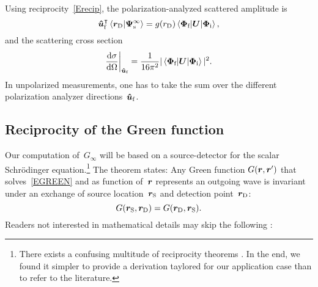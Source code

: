 Using reciprocity~\cref{Erecip},
the polarization-analyzed scattered amplitude is
\begin{equation}
  {\bm{\hat u}}_{\text{f}}^\intercal \braket{\bm{r}_\text{D}|\bm{\Psi}_\text{s}^\infty}
  = g(r_\text{D})\braket{\bm{\Phi}_{\text{f}}|\bm{U}|\bm{\Phi}_{\text{i}}},
\end{equation}
and the scattering cross section
\begin{equation}\label{Exsection2}
  \xElas\bigg|_{\hu_\sf}
  = \frac{1}{16\pi^2} |\braket{\v\Phi_\sf|\TU|\v\Phi_\si}|^2.
\end{equation}
In unpolarized measurements, one has to take the sum over
the different polarization analyzer directions~${\bm{\hat u}}_{\text{f}}$.

\subsection{Reciprocity of the Green function}\label{SReci}

%
%

Our computation of~$G_\infty$ will be based on a source-detector 
for the scalar Schrödinger equation.\footnote
{There exists a confusing multitude of reciprocity theorems \cite{Pot04}.
In the end, we found it simpler to provide a derivation taylored for our application case
than to refer to the literature.}
The theorem states:
Any Green function $G(\bm{r},\bm{r}')$
that solves~\cref{EGREEN} and as function of~$\bm{r}$ represents an outgoing wave
is invariant under an exchange of source location~$\bm{r}_\text{S}$ and detection point~$\bm{r}_\text{D}$:
%
%
\begin{equation}\label{Erecip2}
  G(\rS,\rD) = G(\rD,\rS).
\end{equation}
Readers not interested in mathematical details may skip the following :


